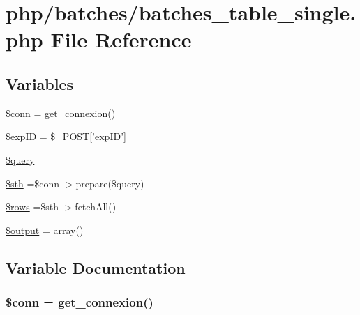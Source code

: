 \hypertarget{batches__table__single_8php}{\section{php/batches/batches\-\_\-table\-\_\-single.php File Reference}
\label{batches__table__single_8php}
}
\subsection*{Variables}
\begin{DoxyCompactItemize}
\item 
\hyperlink{batches__table__single_8php_aa8a5a87b9c1a6a0819b88447cbe41877}{\$conn} = \hyperlink{php__functions_8php_ace18bc10f3fd08f92688ac743e0d8c2e}{get\-\_\-connexion}()
\item 
\hyperlink{batches__table__single_8php_ae384d32e62e85e587cd27bf249ed3db3}{\$exp\-I\-D} = \$\-\_\-\-P\-O\-S\-T\mbox{[}'\hyperlink{admin_rawdata_8php_a888d53a6517f4272b5982c3ca9d16e8a}{exp\-I\-D}'\mbox{]}
\item 
\hyperlink{batches__table__single_8php_af59a5f7cd609e592c41dc3643efd3c98}{\$query}
\item 
\hyperlink{batches__table__single_8php_afa9126f9664959c02795be300a135f93}{\$sth} =\$conn-\/$>$prepare(\$query)
\item 
\hyperlink{batches__table__single_8php_ace2ec39e7df3899fa8df9640ec274b03}{\$rows} =\$sth-\/$>$fetch\-All()
\item 
\hyperlink{batches__table__single_8php_a73004ce9cd673c1bfafd1dc351134797}{\$output} = array()
\end{DoxyCompactItemize}


\subsection{Variable Documentation}
\hypertarget{batches__table__single_8php_aa8a5a87b9c1a6a0819b88447cbe41877}{
\subsubsection[{\$conn}]{\setlength{\rightskip}{0pt plus 5cm}\$conn = {\bf get\-\_\-connexion}()}}\label{batches__table__single_8php_aa8a5a87b9c1a6a0819b88447cbe41877}


